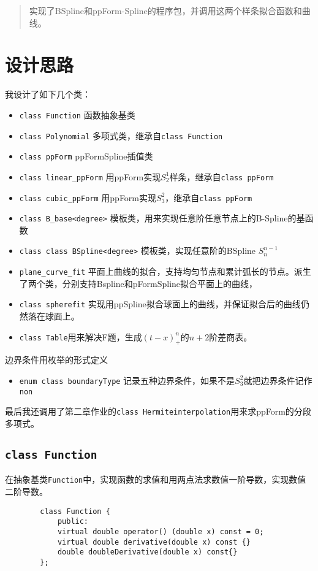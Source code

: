 \documentclass[UTF8]{ctexart}
\begin{document}
	
	\pagestyle{fancy}
	\rhead{\today}
	\begin{abstract}
		实现了BSpline和ppForm-Spline的程序包，并调用这两个样条拟合函数和曲线。
	\end{abstract}
	\section{设计思路}
	我设计了如下几个类：
	\begin{itemize}
		\item \texttt{class Function} 函数抽象基类
		\item \texttt{class Polynomial} 多项式类，继承自\texttt{class Function}
		\item \texttt{class ppForm} ppFormSpline插值类
		\item \texttt{class linear\_ppForm} 用ppForm实现$S_2^1$样条，继承自\texttt{class ppForm}
		\item \texttt{class cubic\_ppForm} 用ppForm实现$S_3^2$，继承自\texttt{class ppForm}
		\item \texttt{class B\_base<degree>} 模板类，用来实现任意阶任意节点上的B-Spline的基函数
		\item \texttt{class class BSpline<degree>} 模板类，实现任意阶的BSpline $S_n^{n-1}$
		\item \texttt{plane\_curve\_fit} 平面上曲线的拟合，支持均匀节点和累计弧长的节点。派生了两个类，分别支持Bspline和pFormSpline拟合平面上的曲线，
		\item \texttt{class spherefit} 实现用ppSpline拟合球面上的曲线，并保证拟合后的曲线仍然落在球面上。
		\item \texttt{class Table}用来解决F题，生成$(t-x)_{+}^n$的$n+2$阶差商表。
	\end{itemize}
	边界条件用枚举的形式定义
	\begin{itemize}
		\item \texttt{enum class boundaryType} 记录五种边界条件，如果不是$S_3^2$就把边界条件记作\texttt{non}
	\end{itemize}
	最后我还调用了第二章作业的\texttt{class Hermiteinterpolation}用来求ppForm的分段多项式。
	\subsection{\texttt{class Function}}
	在抽象基类\texttt{Function}中，实现函数的求值和用两点法求数值一阶导数，实现数值二阶导数。
	\begin{lstlisting}
		class Function {
			public:
			virtual double operator() (double x) const = 0;
			virtual double derivative(double x) const {}
			double doubleDerivative(double x) const{}
		};
	\end{lstlisting}
\end{document}
